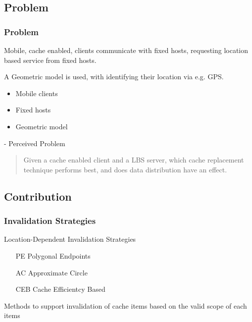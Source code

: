 

\subsection{Problem}

\begin{frame}
\frametitle{Problem}

Mobile, cache enabled, clients communicate with fixed hosts, requesting location based service from fixed hosts. 

A Geometric model is used, with identifying their location via e.g. GPS.

\begin{itemize}
\item Mobile clients
\item Fixed hosts
\item Geometric model
\end{itemize}

\vspace{1em}

- Perceived Problem
\begin{quotation}
	Given a cache enabled client and a LBS server, which cache replacement technique performs best, and does data distribution have an effect.
\end{quotation}
\end{frame}



\subsection{Contribution}
\begin{frame}
\frametitle{Invalidation Strategies}

Location-Dependent Invalidation Strategies
\hspace{1em}

\begin{itemize}
\item[PE\hspace{0.5em}] Polygonal Endpoints
\item[AC\hspace{0.5em}] Approximate Circle
\item[CEB] Cache Efficientcy Based
\end{itemize}

\hspace{1em}

Methods to support invalidation of cache items based on the valid scope of each items 


\end{frame}


